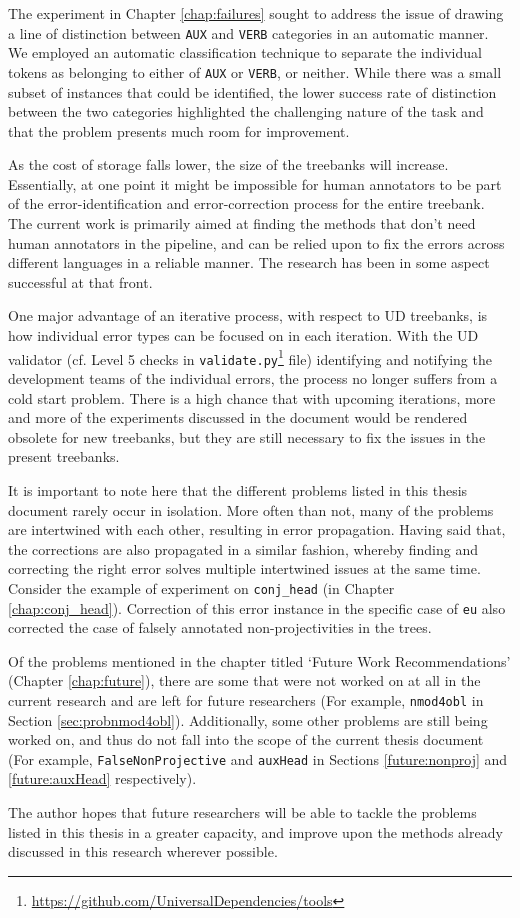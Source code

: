The experiment in Chapter \ref{chap:failures} sought to address the issue of drawing a line of distinction between \texttt{AUX} and \texttt{VERB} categories in an automatic manner. We employed an automatic classification technique to separate the individual tokens as belonging to either of \texttt{AUX} or \texttt{VERB}, or neither. While there was a small subset of instances that could be identified, the lower success rate of distinction between the two categories highlighted the challenging nature of the task and that the problem presents much room for improvement.

As the cost of storage falls lower, the size of the treebanks will increase. Essentially, at one point it might be impossible for human annotators to be part of the error-identification and error-correction process for the entire treebank. The current work is primarily aimed at finding the methods that don't need human annotators in the pipeline, and can be relied upon to fix the errors across different languages in a reliable manner. The research has been in some aspect successful at that front.

One major advantage of an iterative process, with respect to UD treebanks, is how individual error types can be focused on in each iteration. With the UD validator (cf. Level 5 checks in \verb|validate.py|\footnote{\url{https://github.com/UniversalDependencies/tools}} file) identifying and notifying the development teams of the individual errors, the process no longer suffers from a cold start problem. There is a high chance that with upcoming iterations, more and more of the experiments discussed in the document would be rendered obsolete for new treebanks, but they are still necessary to fix the issues in the present treebanks.

It is important to note here that the different problems listed in this thesis document rarely occur in isolation. More often than not, many of the problems are intertwined with each other, resulting in error propagation. Having said that, the corrections are also propagated in a similar fashion, whereby finding and correcting the right error solves multiple intertwined issues at the same time. Consider the example of experiment on \texttt{conj\_head} (in Chapter \ref{chap:conj_head}). Correction of this error instance in the specific case of \verb|eu| also corrected the case of falsely annotated non-projectivities in the trees.

Of the problems mentioned in the chapter titled `Future Work Recommendations' (Chapter \ref{chap:future}), there are some that were not worked on at all in the current research and are left for future researchers (For example, \texttt{nmod4obl} in Section  \ref{sec:probnmod4obl}). Additionally, some other problems are still being worked on, and thus do not fall into the scope of the current thesis document (For example, \texttt{FalseNonProjective} and \texttt{auxHead} in Sections \ref{future:nonproj} and \ref{future:auxHead} respectively).

The author hopes that future researchers will be able to tackle the problems listed in this thesis in a greater capacity, and improve upon the methods already discussed in this research wherever possible.